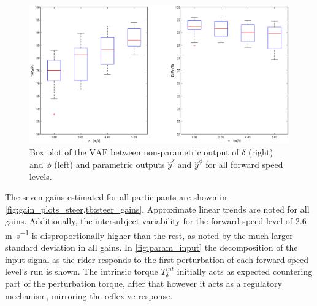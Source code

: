  \begin{figure}[h!]
    \centering

    \includegraphics[width=\linewidth]{images/steer_irf/param_fit_box.eps}
    \caption{Box plot of the  \ensuremath{\mathrm{VAF}} between non-parametric output  of \ensuremath{\delta} (right) and \ensuremath{\phi} (left) and  parametric outputs \ensuremath{\hat{y}^\delta} and \ensuremath{\hat{y}^\phi}  for all forward speed levels.}
    \label{fig:FIT_model}
\end{figure}
The seven gains estimated for all participants are shown in \cref{fig:gain_plots_steer,tb:steer_gains}. Approximate linear trends are noted for all gains. Additionally, the intersubject variability for the forward speed level of 2.6 \si{\meter\per\second} is disproportionally higher than the rest, as noted by the much larger standard deviation in all gains. In \cref{fig:param_input} the decomposition of the input signal as the rider responds to the first perturbation of each forward speed level's run is shown. The intrinsic torque \ensuremath{T_\delta^{int}} initially acts as expected countering part of the perturbation torque, after that however it acts as a  regulatory mechanism, mirroring the reflexive response.

